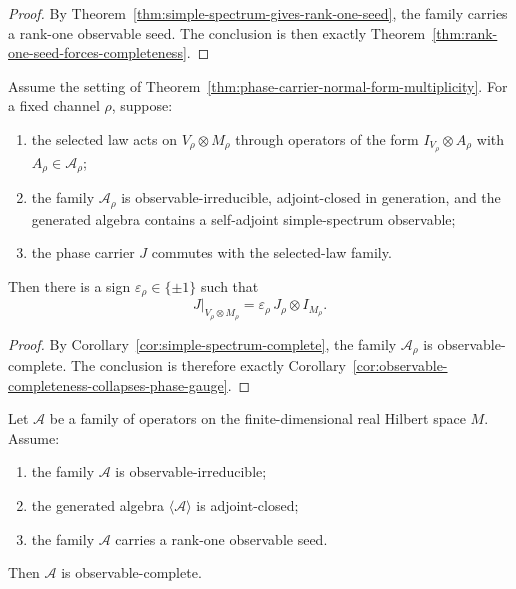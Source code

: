 \begin{proof}
By Theorem~\ref{thm:simple-spectrum-gives-rank-one-seed}, the family carries a
rank-one observable seed. The conclusion is then exactly
Theorem~\ref{thm:rank-one-seed-forces-completeness}.
\end{proof}

\begin{corollary}
\label{cor:simple-spectrum-phase}
Assume the setting of
Theorem~\ref{thm:phase-carrier-normal-form-multiplicity}. For a fixed channel
$\rho$, suppose:
\begin{enumerate}[label=(\roman*), leftmargin=2em, itemsep=0.2em]
\item the selected law acts on $V_{\rho}\otimes M_{\rho}$ through operators of
      the form $I_{V_{\rho}}\otimes A_{\rho}$ with
      $A_{\rho}\in\mathcal A_{\rho}$;
\item the family $\mathcal A_{\rho}$ is observable-irreducible, adjoint-closed
      in generation, and the generated algebra contains a self-adjoint
      simple-spectrum observable;
\item the phase carrier $J$ commutes with the selected-law family.
\end{enumerate}
Then there is a sign $\varepsilon_{\rho}\in\{\pm1\}$ such that
\[
J|_{V_{\rho}\otimes M_{\rho}}
=
\varepsilon_{\rho}\,J_{\rho}\otimes I_{M_{\rho}}.
\]
\end{corollary}

\begin{proof}
By Corollary~\ref{cor:simple-spectrum-complete}, the family
$\mathcal A_{\rho}$ is observable-complete. The conclusion is therefore
exactly Corollary~\ref{cor:observable-completeness-collapses-phase-gauge}.
\end{proof}

\begin{theorem}
\label{thm:rank-one-seed-forces-completeness}
Let $\mathcal A$ be a family of operators on the finite-dimensional real
Hilbert space $M$. Assume:
\begin{enumerate}[label=(\roman*), leftmargin=2em, itemsep=0.2em]
\item the family $\mathcal A$ is observable-irreducible;
\item the generated algebra $\langle\mathcal A\rangle$ is adjoint-closed;
\item the family $\mathcal A$ carries a rank-one observable seed.
\end{enumerate}
Then $\mathcal A$ is observable-complete.
\end{theorem}

